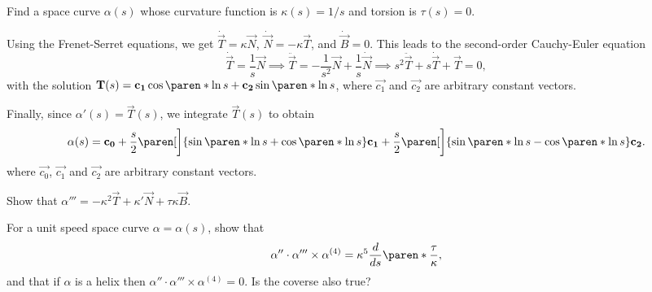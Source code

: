 \documentclass[11pt]{penrose}
\newcommand{\vT}{\vec{T}}
\newcommand{\vN}{\vec{N}}
\newcommand{\vB}{\vec{B}}
\newcommand{\missing}[1]{{\color{red}#1}}
\begin{document}
\begin{negg}
    Find a space curve $\alpha(s)$ whose curvature function is $\kappa(s) = 1/s$ and torsion is $\tau(s) = 0$.

    Using the Frenet-Serret equations, we get $\dot{\vT} = \kappa \vN$, $\dot{\vN} = - \kappa \vT$, and $\dot{\vB} = 0$. This leads to the second-order Cauchy-Euler equation
    \begin{equation}
        \dot{\vT} = \frac{1}{s} \vN
        \implies
        \ddot{\vT} = -\frac{1}{s^2} \vN + \frac{1}{s} \dot{\vN}
        \implies
        s^2 \ddot{\vT} + s \dot{\vT} + \vT = 0,
    \end{equation}
    with the solution $\vT(s) = \vec{c_1} \cos\paren*{\ln s} + \vec{c_2} \sin\paren*{\ln s}$, where $\vec{c_1}$ and $\vec{c_2}$ are arbitrary constant vectors.

    Finally, since $\alpha'(s) = \vT(s)$, we integrate $\vT(s)$ to obtain
    \begin{equation}
        \alpha(s) = \vec{c_0}
        + \frac{s}{2} \paren[\bigg]{\sin\paren*{\ln s} + \cos\paren*{\ln s}} \vec{c_1}
        + \frac{s}{2} \paren[\bigg]{\sin\paren*{\ln s} - \cos\paren*{\ln s}} \vec{c_2}.
    \end{equation}
    where $\vec{c_0}$, $\vec{c_1}$ and $\vec{c_2}$ are arbitrary constant vectors.
\end{negg}

\begin{nex}
    Show that $\alpha''' = -\kappa^2 \vT + \kappa' \vN + \tau\kappa \vB$.
\end{nex}

\begin{nex}
    For a unit speed space curve $\alpha = \alpha(s)$, show that
    \begin{equation}
        \alpha'' \cdot \alpha''' \times \alpha^{(4)} = \kappa^5 \frac{d}{ds}\paren*{\frac{\tau}{\kappa}},
    \end{equation}
    and that if $\alpha$ is a helix then $\alpha'' \cdot \alpha''' \times \alpha^{(4)} = 0$. Is the coverse also true?
\end{nex}

\end{document}
